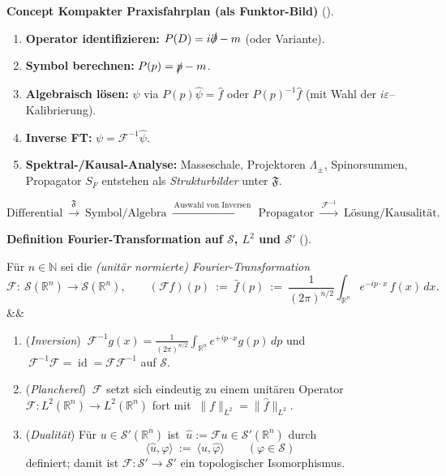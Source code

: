 \documentclass[10pt, letterpaper]{article}
\newcommand{\id}{\operatorname{id}}
\newcommand{\R}{\mathbb{R}}
\newcommand{\N}{\mathbb{N}}
\newenvironment{romanenum}[1][]
  {%
    \ifx&#1&
    \else
      \textbf{#1}\quad
    \fi
    \begin{enumerate}[label=\roman*)]
  }
  {%
    \end{enumerate}%
  }
\newcommand{\CustomHeading}[3]{%
  \par\medskip\noindent%
  \textbf{#1 #2} \textnormal{(#3)}.\enskip%
}
\newenvironment{DEF}[2]{\begin{unitbox}\CustomHeading{Definition}{#1}{#2}}{\end{unitbox}}
\newenvironment{CONC}[2]{\begin{unitbox}\CustomHeading{Concept}{#1}{#2}}{\end{unitbox}}
\begin{document}


\begin{CONC}{Kompakter Praxisfahrplan (als Funktor-Bild)}{}
\begin{enumerate}
\item \textbf{Operator identifizieren:} $P(D)=i\slashed{\partial}-m$ (oder Variante).
\item \textbf{Symbol berechnen:} $P(p)=\slashed{p}-m$.
\item \textbf{Algebraisch lösen:} $\hat\psi$ via $P(p)\hat\psi=\hat f$ oder $P(p)^{-1}\hat f$ (mit Wahl der $i\varepsilon$–Kalibrierung).
\item \textbf{Inverse FT:} $\psi=\mathcal{F}^{-1}\hat\psi$.
\item \textbf{Spektral-/Kausal-Analyse:} Masseschale, Projektoren $\Lambda_\pm$, Spinorsummen, Propagator $S_F$ entstehen als \emph{Strukturbilder} unter $\mathfrak{F}$.
\end{enumerate}
\[
\boxed{\text{Differential} \ \xrightarrow{\ \mathfrak{F}\ }\ \text{Symbol/Algebra}
\ \xrightarrow{\ \text{Auswahl von Inversen}\ }\ \text{Propagator}
\ \xrightarrow{\ \mathcal{F}^{-1}\ }\ \text{Lösung/Kausalität}.}
\]
\end{CONC}





\begin{DEF}{Fourier-Transformation auf $\mathcal{S}$, $L^2$ und $\mathcal{S}'$}{}
Für $n\in\N$ sei die \emph{(unitär normierte) Fourier-Transformation}
\[
\mathcal{F}:\ \mathcal{S}(\R^n)\longrightarrow \mathcal{S}(\R^n),\qquad
(\mathcal{F}f)(p)\ :=\ \hat f(p)\ :=\ \frac{1}{(2\pi)^{n/2}}\int_{\R^n}e^{-ip\cdot x}\,f(x)\,dx.
\]
\begin{romanenum}
\item (\emph{Inversion}) $\ \mathcal{F}^{-1}g(x)=\frac{1}{(2\pi)^{n/2}}\int_{\R^n}e^{+ip\cdot x}g(p)\,dp$ und $\ \mathcal{F}^{-1}\mathcal{F}=\id=\mathcal{F}\mathcal{F}^{-1}$ auf $\mathcal{S}$.
\item (\emph{Plancherel}) $\ \mathcal{F}$ setzt sich eindeutig zu einem unitären Operator $\mathcal{F}:L^2(\R^n)\to L^2(\R^n)$ fort mit
$\ \|f\|_{L^2}=\|\hat f\|_{L^2}$.
\item (\emph{Dualität}) Für $u\in\mathcal{S}'(\R^n)$ ist $\ \hat u:=\mathcal{F}u\in\mathcal{S}'(\R^n)$ durch
\[
\langle \hat u,\varphi\rangle\ :=\ \langle u,\hat\varphi\rangle\qquad(\varphi\in\mathcal{S})
\]
definiert; damit ist $\mathcal{F}:\mathcal{S}'\to\mathcal{S}'$ ein topologischer Isomorphismus.
\end{romanenum}
\end{DEF}
\end{document}
